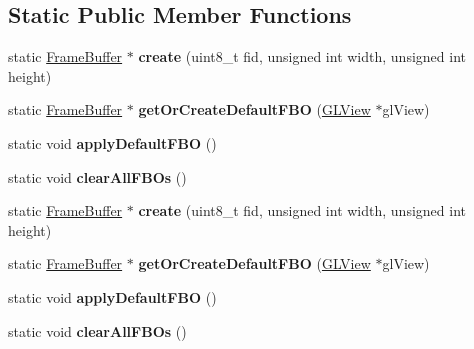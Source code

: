 \subsection*{Static Public Member Functions}
\begin{DoxyCompactItemize}
\item 
\mbox{\label{classexperimental_1_1FrameBuffer_a70129cfefa7a39014796b2faca2ab867}} 
static \hyperlink{classexperimental_1_1FrameBuffer}{Frame\+Buffer} $\ast$ {\bfseries create} (uint8\+\_\+t fid, unsigned int width, unsigned int height)
\item 
\mbox{\label{classexperimental_1_1FrameBuffer_a93378b7b8a3a359ea7eea61abc2510c5}} 
static \hyperlink{classexperimental_1_1FrameBuffer}{Frame\+Buffer} $\ast$ {\bfseries get\+Or\+Create\+Default\+F\+BO} (\hyperlink{classGLView}{G\+L\+View} $\ast$gl\+View)
\item 
\mbox{\label{classexperimental_1_1FrameBuffer_acdaf08ce1ea255e4bba948519dd0cdfc}} 
static void {\bfseries apply\+Default\+F\+BO} ()
\item 
\mbox{\label{classexperimental_1_1FrameBuffer_a1af57384fcbfcbc6c5e16023a6aa86ba}} 
static void {\bfseries clear\+All\+F\+B\+Os} ()
\item 
\mbox{\label{classexperimental_1_1FrameBuffer_aaea0425453b633af22a055e16bc213d0}} 
static \hyperlink{classexperimental_1_1FrameBuffer}{Frame\+Buffer} $\ast$ {\bfseries create} (uint8\+\_\+t fid, unsigned int width, unsigned int height)
\item 
\mbox{\label{classexperimental_1_1FrameBuffer_aabf33ca5e50e1ce451b6487285d4c8ed}} 
static \hyperlink{classexperimental_1_1FrameBuffer}{Frame\+Buffer} $\ast$ {\bfseries get\+Or\+Create\+Default\+F\+BO} (\hyperlink{classGLView}{G\+L\+View} $\ast$gl\+View)
\item 
\mbox{\label{classexperimental_1_1FrameBuffer_af212c07efe10ef883619ea4b27c8a41c}} 
static void {\bfseries apply\+Default\+F\+BO} ()
\item 
\mbox{\label{classexperimental_1_1FrameBuffer_a2d5e665280e53807357ba8d26c1bbb3c}} 
static void {\bfseries clear\+All\+F\+B\+Os} ()
\end{DoxyCompactItemize}
